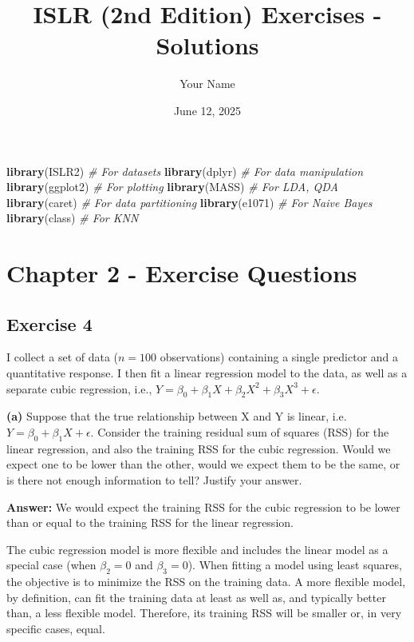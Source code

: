 \documentclass[
]{article}
\title{ISLR (2nd Edition) Exercises - Solutions}
\author{Your Name}
\date{June 12, 2025}
\newenvironment{Shaded}{\begin{snugshade}}{\end{snugshade}}
\newcommand{\CommentTok}[1]{\textcolor[rgb]{0.56,0.35,0.01}{\textit{#1}}}
\newcommand{\FunctionTok}[1]{\textcolor[rgb]{0.13,0.29,0.53}{\textbf{#1}}}
\newcommand{\NormalTok}[1]{#1}
\begin{document}
\maketitle

{
\setcounter{tocdepth}{2}
\tableofcontents
}
\begin{Shaded}
\begin{Highlighting}[]
\FunctionTok{library}\NormalTok{(ISLR2)      }\CommentTok{\# For datasets}
\FunctionTok{library}\NormalTok{(dplyr)      }\CommentTok{\# For data manipulation}
\FunctionTok{library}\NormalTok{(ggplot2)    }\CommentTok{\# For plotting}
\FunctionTok{library}\NormalTok{(MASS)       }\CommentTok{\# For LDA, QDA}
\FunctionTok{library}\NormalTok{(caret)      }\CommentTok{\# For data partitioning}
\FunctionTok{library}\NormalTok{(e1071)      }\CommentTok{\# For Naive Bayes}
\FunctionTok{library}\NormalTok{(class)      }\CommentTok{\# For KNN}
\end{Highlighting}
\end{Shaded}

\section{Chapter 2 - Exercise
Questions}\label{chapter-2---exercise-questions}

\subsection{Exercise 4}\label{exercise-4}

I collect a set of data (\(n = 100\) observations) containing a single
predictor and a quantitative response. I then fit a linear regression
model to the data, as well as a separate cubic regression, i.e.,
\(Y = \beta_0 + \beta_1X + \beta_2X^2 + \beta_3X^3 + \epsilon\).

\textbf{(a)} Suppose that the true relationship between X and Y is
linear, i.e.~\(Y = \beta_0 + \beta_1X + \epsilon\). Consider the
training residual sum of squares (RSS) for the linear regression, and
also the training RSS for the cubic regression. Would we expect one to
be lower than the other, would we expect them to be the same, or is
there not enough information to tell? Justify your answer.

\textbf{Answer:} We would expect the training RSS for the cubic
regression to be lower than or equal to the training RSS for the linear
regression.

The cubic regression model is more flexible and includes the linear
model as a special case (when \(\beta_2 = 0\) and \(\beta_3 = 0\)). When
fitting a model using least squares, the objective is to minimize the
RSS on the training data. A more flexible model, by definition, can fit
the training data at least as well as, and typically better than, a less
flexible model. Therefore, its training RSS will be smaller or, in very
specific cases, equal.
\end{document}
